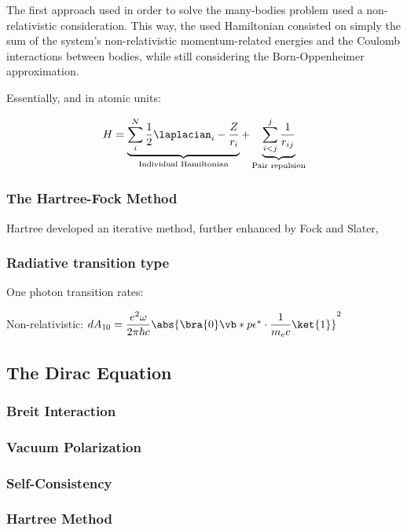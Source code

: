 The first approach used in order to solve the many-bodies problem used a non-relativistic consideration. This way, the used Hamiltonian consisted on simply the sum of the system's non-relativistic momentum-related energies and the Coulomb interactions between bodies, while still considering the Born-Oppenheimer approximation.

Essentially, and in atomic units:

\begin{equation}
    H= \underbrace{\displaystyle\sum_i^N \dfrac{1}{2}\laplacian_i  -\frac{Z}{r_i}}_{\text{Individual Hamiltonian}} + \underbrace{\sum_{i<j}^{j}\dfrac{1}{r_{ij}}}_{\text{Pair repulsion}}
\end{equation}

\subsubsection{The Hartree-Fock Method}

Hartree developed an iterative method, further enhanced by Fock and Slater,

\subsubsection{Radiative transition type}

One photon transition rates:

Non-relativistic: $dA_{10}=\dfrac{e^2 \omega}{2\pi \hbar c}\abs{\bra{0} \vb*{p\epsilon}^*\cdot\dfrac{1}{m_e c}\ket{1}}^2$

\subsection{The Dirac Equation}

\subsubsection{Breit Interaction}
\subsubsection{Vacuum Polarization}
\subsubsection{Self-Consistency}
\subsubsection{Hartree Method}
